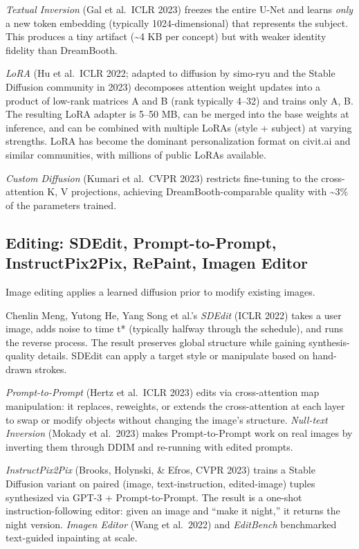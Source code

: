 \emph{Textual Inversion} (Gal et al.~ICLR 2023) freezes the entire U-Net and learns \emph{only} a new token embedding (typically 1024-dimensional) that represents the subject. This produces a tiny artifact (\textasciitilde4 KB per concept) but with weaker identity fidelity than DreamBooth.

\emph{LoRA} (Hu et al.~ICLR 2022; adapted to diffusion by simo-ryu and the Stable Diffusion community in 2023) decomposes attention weight updates into a product of low-rank matrices A and B (rank typically 4--32) and trains only A, B. The resulting LoRA adapter is 5--50 MB, can be merged into the base weights at inference, and can be combined with multiple LoRAs (style + subject) at varying strengths. LoRA has become the dominant personalization format on civit.ai and similar communities, with millions of public LoRAs available.

\emph{Custom Diffusion} (Kumari et al.~CVPR 2023) restricts fine-tuning to the cross-attention K, V projections, achieving DreamBooth-comparable quality with \textasciitilde3\% of the parameters trained.

\subsection{Editing: SDEdit, Prompt-to-Prompt, InstructPix2Pix, RePaint, Imagen Editor}\label{editing-sdedit-prompt-to-prompt-instructpix2pix-repaint-imagen-editor}

Image editing applies a learned diffusion prior to modify existing images.

Chenlin Meng, Yutong He, Yang Song et al.'s \emph{SDEdit} (ICLR 2022) takes a user image, adds noise to time t* (typically halfway through the schedule), and runs the reverse process. The result preserves global structure while gaining synthesis-quality details. SDEdit can apply a target style or manipulate based on hand-drawn strokes.

\emph{Prompt-to-Prompt} (Hertz et al.~ICLR 2023) edits via cross-attention map manipulation: it replaces, reweights, or extends the cross-attention at each layer to swap or modify objects without changing the image's structure. \emph{Null-text Inversion} (Mokady et al.~2023) makes Prompt-to-Prompt work on real images by inverting them through DDIM and re-running with edited prompts.

\emph{InstructPix2Pix} (Brooks, Holynski, \& Efros, CVPR 2023) trains a Stable Diffusion variant on paired (image, text-instruction, edited-image) tuples synthesized via GPT-3 + Prompt-to-Prompt. The result is a one-shot instruction-following editor: given an image and ``make it night,'' it returns the night version. \emph{Imagen Editor} (Wang et al.~2022) and \emph{EditBench} benchmarked text-guided inpainting at scale.

